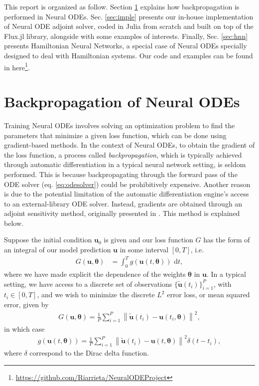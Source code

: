 \documentclass[final,onefignum,onetabnum]{siamart220329}
\newcommand{\bol}{\boldsymbol}
\newcommand{\de}{\,\mathrm{d}}
\newcommand{\norm}[1]{\left\|#1\right\|}
\newcounter{example}
\begin{document}
This report is organized as follow. Section \ref{sec:back} explains how backpropagation is performed in Neural ODEs. Sec. \ref{sec:imple} presents our in-house implementation of Neural ODE adjoint solver, coded in Julia from scratch and built on top of the Flux.jl library, alongside with some examples of interests. Finally, Sec. \ref{sec:hnn} presents Hamiltonian Neural Networks, a special case of Neural ODEs specially designed to deal with Hamiltonian systems. Our code and examples can be found in here\footnote{\url{https://github.com/Riarrieta/NeuralODEProject}}.

\section{Backpropagation of Neural ODEs}\label{sec:back}
Training Neural ODEs involves solving an optimization problem to find the parameters that minimize a given loss function, which can be done using gradient-based methods. In the context of Neural ODEs, to obtain the gradient of the loss function, a process called \textit{backpropagation}, which is typically achieved through automatic differentiation in a typical neural network setting, is seldom performed. This is because backpropagating through the forward pass of the ODE solver (eq. \ref{eq:odesolver}) could be prohibitively expensive. Another reason is due to the potential limitation of the automatic differentiation engine's access to an external-library ODE solver. Instead, gradients are obtained through an adjoint sensitivity method, originally presented in \cite{chen2018neural}. This method is explained below.

Suppose the initial condition $\bol u_0$ is given and our loss function $G$ has the form of an integral of our model prediction $\bol u$ in some interval $[0,T]$, i.e.
\begin{align}
	G(\bol{u},\bol\theta) &= \int_0^T g(\bol{u}(t,\bol\theta))\, \de{t}, \label{eq:loss}
\end{align}
where we have made explicit the dependence of the weights $\bol \theta$ in $\bol u$. In a typical setting, we have access to a discrete set of observations $\{\tilde{\bol{u}}(t_i)\}_{i=1}^P$, with $t_i \in [0,T]$, and we wish to minimize the discrete $L^2$ error loss, or mean squared error, given by
\begin{align}
	G(\bol{u},\bol\theta) = \frac{1}{P}\sum_{i=1}^{P}\norm{\tilde{\bol{u}}(t_i)-{\bol{u}}(t_i,\bol \theta)}^2, \label{eq:mse}
\end{align}
in which case
\begin{align}
	g(\bol{u}(t,\bol\theta)) = \frac{1}{P}\sum_{i=1}^{P}\norm{\tilde{\bol{u}}(t_i)-{\bol{u}}(t,\bol \theta)}^2\delta(t-t_i),
\end{align}
where $\delta$ correspond to the Dirac delta function.
\end{document}
